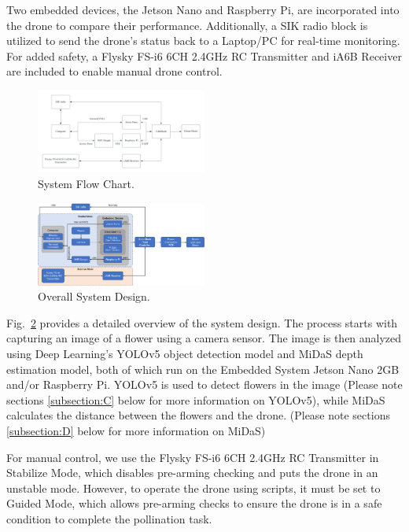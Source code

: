 Two embedded devices, the Jetson Nano and Raspberry Pi, are incorporated into the drone to compare their performance. Additionally, a SIK radio block is utilized to send the drone's status back to a Laptop/PC for real-time monitoring. For added safety, a Flysky FS-i6 6CH 2.4GHz RC Transmitter and iA6B Receiver are included to enable manual drone control.

    \begin{figure}[H]
        \centerline{\includegraphics[width=0.5\textwidth]{Figures/Methods/System Flow Chart.png}}
        \caption{System Flow Chart.}
        \label{fig5}
    \end{figure}

    \begin{figure}[H]
        \centerline{\includegraphics[width=0.5\textwidth]{Figures/Methods/System_Overall_Design.png}}
        \caption{Overall System Design.}
        \label{fig6}
    \end{figure}

Fig.~\ref{fig6} provides a detailed overview of the system design. The process starts with capturing an image of a flower using a camera sensor. The image is then analyzed using Deep Learning's YOLOv5 object detection model and MiDaS depth estimation model, both of which run on the Embedded System Jetson Nano 2GB and/or Raspberry Pi. YOLOv5 is used to detect flowers in the image (Please note sections \ref{subsection:C} below for more information on YOLOv5), while MiDaS calculates the distance between the flowers and the drone. (Please note sections \ref{subsection:D} below for more information on MiDaS)

 For manual control, we use the Flysky FS-i6 6CH 2.4GHz RC Transmitter in Stabilize Mode, which disables pre-arming checking and puts the drone in an unstable mode. However, to operate the drone using scripts, it must be set to Guided Mode, which allows pre-arming checks to ensure the drone is in a safe condition to complete the pollination task.
    
